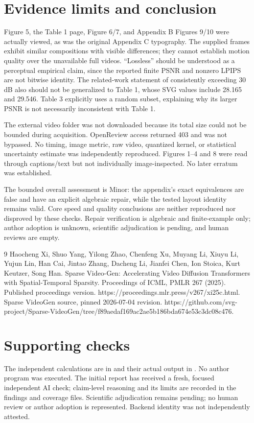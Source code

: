 \documentclass[10pt]{article}
\begin{document}
\section*{Evidence limits and conclusion}
Figure 5, the Table 1 page, Figure 6/7, and Appendix B Figures 9/10 were actually viewed, as was the original Appendix C typography. The supplied frames exhibit similar compositions with visible differences; they cannot establish motion quality over the unavailable full videos. “Lossless” should be understood as a perceptual empirical claim, since the reported finite PSNR and nonzero LPIPS are not bitwise identity. The related-work statement of consistently exceeding 30 dB also should not be generalized to Table 1, whose SVG values include 28.165 and 29.546. Table 3 explicitly uses a random subset, explaining why its larger PSNR is not necessarily inconsistent with Table 1.\par
The external video folder was not downloaded because its total size could not be bounded during acquisition. OpenReview access returned 403 and was not bypassed. No timing, image metric, raw video, quantized kernel, or statistical uncertainty estimate was independently reproduced. Figures 1–4 and 8 were read through captions/text but not individually image-inspected. No later erratum was established.\par
The bounded overall assessment is Minor: the appendix’s exact equivalences are false and have an explicit algebraic repair, while the tested layout identity remains valid. Core speed and quality conclusions are neither reproduced nor disproved by these checks. Repair verification is algebraic and finite-example only; author adoption is unknown, scientific adjudication is pending, and human reviews are empty.\par
9 Haocheng Xi, Shuo Yang, Yilong Zhao, Chenfeng Xu, Muyang Li, Xiuyu Li, Yujun Lin, Han Cai, Jintao Zhang, Dacheng Li, Jianfei Chen, Ion Stoica, Kurt Keutzer, Song Han. Sparse Video-Gen: Accelerating Video Diffusion Transformers with Spatial-Temporal Sparsity. Proceedings of ICML, PMLR 267 (2025). Published proceedings version. https://proceedings.mlr.press/v267/xi25c.html. Sparse VideoGen source, pinned 2026-07-04 revision. https://github.com/svg-project/Sparse-VideoGen/tree/f89aedaf169ac2ae5b186bda674e53c3dc08c476.\par
\section*{Supporting checks}
The independent calculations are in and their actual output in . No author program was executed. The initial report has received a fresh, focused independent AI check; claim-level reasoning and its limits are recorded in the findings and coverage files. Scientific adjudication remains pending; no human review or author adoption is represented. Backend identity was not independently attested.\par
\end{document}
